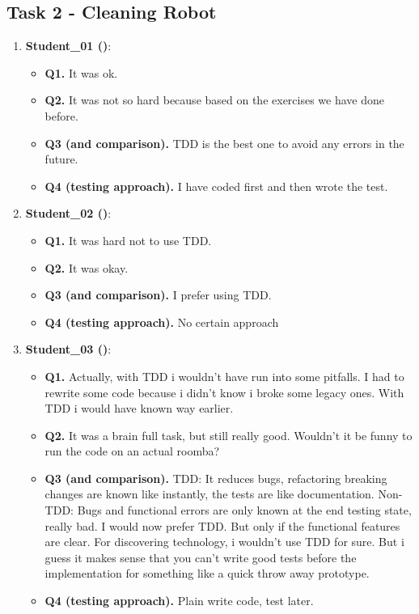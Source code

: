 \subsection{Task 2 - Cleaning Robot}
\begin{enumerate}
    \item \textbf{Student\_01 (\notdd)}:
    \begin{itemize}
        \item \textbf{Q1.} It was ok.
        \item \textbf{Q2.} It was not so hard because based on the exercises we have done before. 
        \item \textbf{Q3 (\tdd and \notdd comparison).} TDD is the best one to avoid any errors in the future.
        \item \textbf{Q4 (\notdd testing approach).} I have coded first and then wrote the test.  
    \end{itemize}

    \item \textbf{Student\_02 (\notdd)}:
    \begin{itemize}
        \item \textbf{Q1.} It was hard not to use TDD.
        \item \textbf{Q2.} It was okay.
        \item \textbf{Q3 (\tdd and \notdd comparison).} I prefer using TDD.
        \item \textbf{Q4 (\notdd testing approach).} No certain approach  
    \end{itemize}

    \item \textbf{Student\_03 (\notdd)}:
    \begin{itemize}
        \item \textbf{Q1.} Actually, with TDD i wouldn't have run into some pitfalls. I had to rewrite some code because i didn’t know i broke some legacy ones. With TDD i would have known way earlier. 
        \item \textbf{Q2.} It was a brain full task, but still really good. Wouldn’t it be funny to run the code on an actual roomba?
        \item \textbf{Q3 (\tdd and \notdd comparison).} TDD: It reduces bugs, refactoring breaking changes are known like instantly, the tests are like documentation.  Non-TDD: Bugs and functional errors are only known at the end testing state, really bad. I would now prefer TDD. But only if the functional features are clear. For discovering technology, i wouldn't use TDD for sure. But i guess it makes sense that you can’t write good tests before the implementation for something like a quick throw away prototype.
        \item \textbf{Q4 (\notdd testing approach).} Plain write code, test later.   
    \end{itemize}


\end{enumerate}
